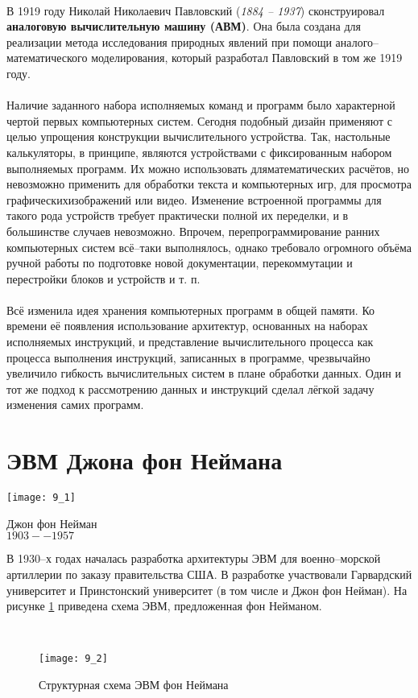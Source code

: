 \\В 1919 году Николай Николаевич Павловский (\emph{1884 -- 1937}) сконструировал \textbf{аналоговую вычислительную машину (АВМ)}. Она была создана для реализации метода исследования природных явлений при помощи аналого--математического моделирования, который разработал Павловский в том же 1919 году.
\\\\Наличие заданного набора исполняемых команд и программ было характерной чертой первых компьютерных систем. Сегодня подобный дизайн применяют с целью упрощения конструкции вычислительного устройства. Так, настольные калькуляторы, в принципе, являются устройствами с фиксированным набором выполняемых программ. Их можно использовать дляматематических расчётов, но невозможно применить для обработки текста и компьютерных игр, для просмотра графическихизображений или видео. Изменение встроенной программы для такого рода устройств требует практически полной их переделки, и в большинстве случаев невозможно. Впрочем, перепрограммирование ранних компьютерных систем всё--таки выполнялось, однако требовало огромного объёма ручной работы по подготовке новой документации, перекоммутации и перестройки блоков и устройств и т. п.
\\\\Всё изменила идея хранения компьютерных программ в общей памяти. Ко времени её появления использование архитектур, основанных на наборах исполняемых инструкций, и представление вычислительного процесса как процесса выполнения инструкций, записанных в программе, чрезвычайно увеличило гибкость вычислительных систем в плане обработки данных. Один и тот же подход к рассмотрению данных и инструкций сделал лёгкой задачу изменения самих программ.

\section{ЭВМ Джона фон Неймана}
\begin{minipage}[l]{3cm}
\texttt{[image: 9\_1]}
\begin{center}
\footnotesize{Джон фон Нейман}
\\\footnotesize{$1903 -- 1957$}
\end{center}
\end{minipage}
\hfill
\begin{minipage}[r]{7.5cm}
В 1930--х годах началась разработка архитектуры ЭВМ для военно--морской артиллерии по заказу правительства США. В разработке участвовали Гарвардский университет и Принстонский университет (в том числе и Джон фон Нейман). На рисунке \ref{tag:EVM_von_Neumann} приведена схема ЭВМ, предложенная фон Нейманом.
\end{minipage}
\\
\begin{figure}[h]
\texttt{[image: 9\_2]}
\caption{Структурная схема ЭВМ фон Неймана}
\label{tag:EVM_von_Neumann}
\end{figure}
